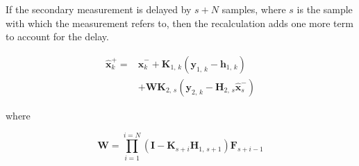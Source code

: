 	If the secondary measurement is delayed by $s+N$ samples, where $s$ is the sample with which the measurement refers to, then the recalculation adds one more term to account for the delay.
	
	\begin{equation}
	\begin{aligned}
	\label{eq:x+del}
		\hat{\boldsymbol{x}}_{k}^{+}=&\hat{\boldsymbol{x}}_{k}^{-} + \boldsymbol{K}_{1,\,k}\left(\boldsymbol{y}_{1,\,k}- \boldsymbol{h}_{1,\,k}\right)	\\
		&+ \boldsymbol{W}\boldsymbol{K}_{2,\,s}\left(\boldsymbol{y}_{2,\,k}-\boldsymbol{H}_{2,\,s}\hat{\boldsymbol{x}}_{s}^{-}\right)
	\end{aligned}
	\end{equation}
	
	where
	
	\begin{equation}
	\label{eq:W}
		\boldsymbol{W} = \prod^{i=N}_{i=1}\left(\boldsymbol{I} - \boldsymbol{K}_{s+i}\boldsymbol{H}_{1,\,s+1}\right)\boldsymbol{F}_{s+i-1}
	\end{equation}